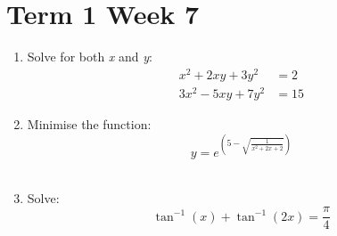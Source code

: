 \documentclass[../main.tex]{subfiles}
\begin{document}
\section*{Term 1 Week 7}
\begin{enumerate}
    \item 
    Solve for both \textit{x} and \textit{y}:
    \begin{align*}
    x^2+2xy+3y^2
    &=2\\
    3x^2-5xy+7y^2
    &=15
    \end{align*}
    \item 
    Minimise the function:\\
    \[y=e^{(5-\sqrt{\frac{1}{x^2+2x+2}})}\]\\

    \item 
    Solve:\\
    \[\tan^{-1}{(x)}+\tan^{-1}{(2x)}=\frac{\pi}{4}\]

    
\end{enumerate}
\end{document}
